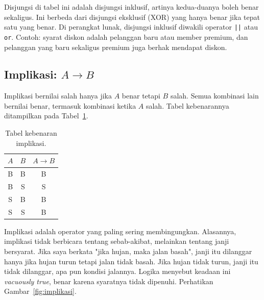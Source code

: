 \documentclass[11pt,a4paper]{article}
\begin{document}
Disjungsi di tabel ini adalah disjungsi inklusif, artinya kedua-duanya boleh benar sekaligus. Ini berbeda dari disjungsi eksklusif (XOR) yang hanya benar jika tepat satu yang benar. Di perangkat lunak, disjungsi inklusif diwakili operator \texttt{||} atau \texttt{or}. Contoh: syarat diskon adalah pelanggan baru atau member premium, dan pelanggan yang baru sekaligus premium juga berhak mendapat diskon.

\subsection{Implikasi: $A \to B$}

Implikasi bernilai salah hanya jika $A$ benar tetapi $B$ salah. Semua kombinasi lain bernilai benar, termasuk kombinasi ketika $A$ salah. Tabel kebenarannya ditampilkan pada Tabel~\ref{tab:implikasi}.

\begin{table}[H]
	\centering
	\caption{Tabel kebenaran implikasi.}
	\label{tab:implikasi}
	\small
	\begin{tabular}{c c c}
		\toprule
		$A$ & $B$ & $A \to B$ \\
		\midrule
		B & B & B \\
		B & S & S \\
		S & B & B \\
		S & S & B \\
		\bottomrule
	\end{tabular}
\end{table}

Implikasi adalah operator yang paling sering membingungkan. Alasannya, implikasi tidak berbicara tentang sebab-akibat, melainkan tentang janji bersyarat. Jika saya berkata "jika hujan, maka jalan basah", janji itu dilanggar hanya jika hujan turun tetapi jalan tidak basah. Jika hujan tidak turun, janji itu tidak dilanggar, apa pun kondisi jalannya. Logika menyebut keadaan ini \textit{vacuously true}, benar karena syaratnya tidak dipenuhi. Perhatikan Gambar~\ref{fig:implikasi}.
\end{document}
